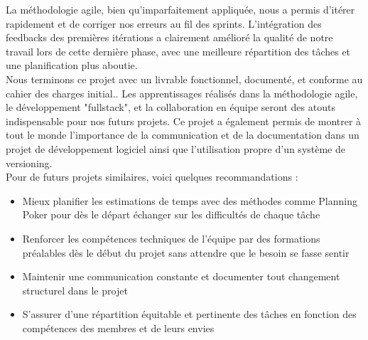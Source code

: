 \documentclass[a4paper]{article}
\begin{document}
La méthodologie agile, bien qu’imparfaitement appliquée, nous a permis d’itérer rapidement et de corriger nos erreurs au fil des sprints. L'intégration des feedbacks des premières itérations a clairement amélioré la qualité de notre travail lors de cette dernière phase, avec une meilleure répartition des tâches et une planification plus aboutie. \\

Nous terminons ce projet avec un livrable fonctionnel, documenté, et conforme au cahier des charges initial.. Les apprentissages réalisés dans la méthodologie agile, le développement "fullstack", et la collaboration en équipe seront des atouts indispensable pour nos futurs projets. Ce projet a également permis de montrer à tout le monde l'importance de la communication et de la documentation dans un projet de développement logiciel ainsi que l'utilisation propre d'un système de versioning. \\

Pour de futurs projets similaires, voici quelques recommandations :
\begin{itemize}
    \item Mieux planifier les estimations de temps avec des méthodes comme Planning Poker pour dès le départ échanger sur les difficultés de chaque tâche
    \item Renforcer les compétences techniques de l'équipe par des formations préalables dès le début du projet sans attendre que le besoin se fasse sentir
    \item Maintenir une communication constante et documenter tout changement structurel dans le projet
    \item S'assurer d'une répartition équitable et pertinente des tâches en fonction des compétences des membres et de leurs envies
\end{itemize}
\end{document}
